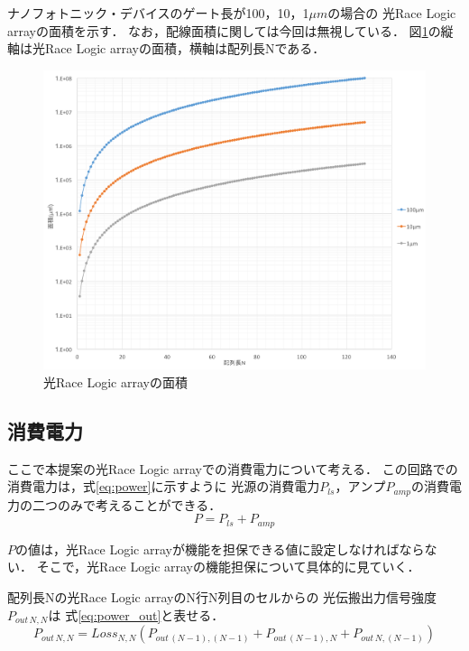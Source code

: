 ナノフォトニック・デバイスのゲート長が100，10，1$\mu m$の場合の
光Race Logic arrayの面積を示す．
なお，配線面積に関しては今回は無視している．
図\ref{fig:nanoArea}の縦軸は光Race Logic arrayの面積，横軸は配列長Nである．
\begin{figure}[t!]
\begin{center}
\includegraphics[keepaspectratio,scale=0.5]{fig/4/nanoArea.png}
\caption{光Race Logic arrayの面積}
\label{fig:nanoArea}
\end{center}
\end{figure}

\subsection{消費電力}
ここで本提案の光Race Logic arrayでの消費電力について考える．
この回路での消費電力は，式\ref{eq:power}に示すように
$光源の消費電力P_{ls}$，$アンプP_{amp}$の消費電力の二つのみで考えることができる．
\begin{equation}
P=P_{ls}+P_{amp}
\label{eq:power}
\end{equation}

$P$の値は，光Race Logic arrayが機能を担保できる値に設定しなければならない．
そこで，光Race Logic arrayの機能担保について具体的に見ていく．

配列長Nの光Race Logic arrayのN行N列目のセルからの
光伝搬出力信号強度$P_{out\,N,N}$は
式\ref{eq:power_out}と表せる．
\begin{equation}
P_{out\,N,N}=Loss_{N,N}(P_{out\,(N-1),(N-1)}+P_{out\,(N-1),N}+P_{out\,N,(N-1)})
\label{eq:power_out}
\end{equation}

